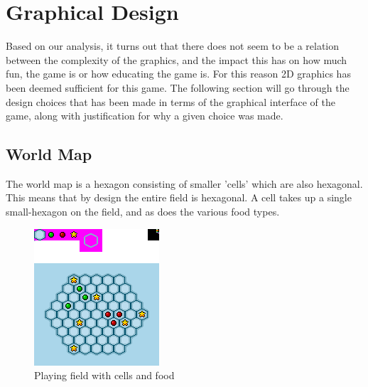 \section{Graphical Design}

Based on our analysis, it turns out that there does not seem to be a relation between the complexity of the graphics, and the impact this has on how 
much fun, the game is or how educating the game is. For this reason 2D graphics has been deemed sufficient for this game. The following section will go 
through the design choices that has been made in terms of the graphical interface of the game, along with justification for why a given choice was made.

\subsection{World Map}

The world map is a hexagon consisting of smaller 'cells' which are also hexagonal. This means that by design the entire field is hexagonal. A cell takes 
up a single small-hexagon on the field, and as does the various food types.


\begin{figure}[h]
	\centering
		\includegraphics{img/cells_mockup.png}
	\caption{Playing field with cells and food}
	\label{fig:cells_mockup}
\end{figure}